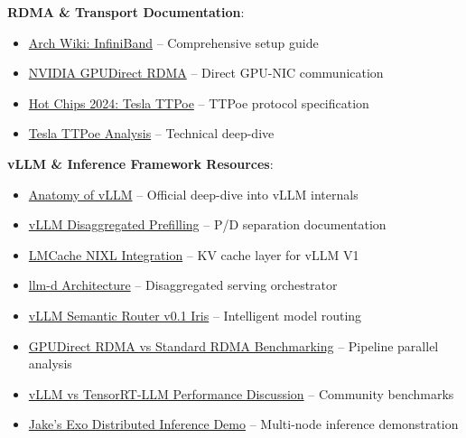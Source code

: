 \documentclass[10pt,letterpaper]{article}
\begin{document}
\textbf{RDMA \& Transport Documentation}:
\begin{itemize}[noitemsep]
    \item \href{https://wiki.archlinux.org/title/InfiniBand}{Arch Wiki: InfiniBand} -- Comprehensive setup guide
    \item \href{https://docs.nvidia.com/cuda/gpudirect-rdma/index.html}{NVIDIA GPUDirect RDMA} -- Direct GPU-NIC communication
    \item \href{https://hc2024.hotchips.org/assets/program/conference/day2/17_HC2024_Tesla_TTPoE_v5.pdf}{Hot Chips 2024: Tesla TTPoe} -- TTPoe protocol specification
    \item \href{https://chipsandcheese.com/p/teslas-ttpoe-at-hot-chips-2024-replacing-tcp-for-low-latency-applications}{Tesla TTPoe Analysis} -- Technical deep-dive
\end{itemize}

\textbf{vLLM \& Inference Framework Resources}:
\begin{itemize}[noitemsep]
    \item \href{https://blog.vllm.ai/2025/09/05/anatomy-of-vllm.html}{Anatomy of vLLM} -- Official deep-dive into vLLM internals
    \item \href{https://docs.vllm.ai/en/latest/features/disagg_prefill/}{vLLM Disaggregated Prefilling} -- P/D separation documentation
    \item \href{https://blog.lmcache.ai/2025-04-11-lmcache-vllmv1-nixl/}{LMCache NIXL Integration} -- KV cache layer for vLLM V1
    \item \href{https://llm-d.ai/docs/architecture}{llm-d Architecture} -- Disaggregated serving orchestrator
    \item \href{https://blog.vllm.ai/2026/01/05/vllm-sr-iris.html}{vLLM Semantic Router v0.1 Iris} -- Intelligent model routing
    \item \href{https://discuss.vllm.ai/t/vllm-benchmarking-why-is-gpudirect-rdma-not-outperforming-standard-rdma-in-a-pipeline-parallel-setup/1377}{GPUDirect RDMA vs Standard RDMA Benchmarking} -- Pipeline parallel analysis
    \item \href{https://www.reddit.com/r/LocalLLaMA/comments/1oyawkl/why_is_vllm_outperforming_tensorrtllm_nvidias/}{vLLM vs TensorRT-LLM Performance Discussion} -- Community benchmarks
    \item \href{https://www.reddit.com/r/LocalLLaMA/comments/1pq5k6e/jake_formerly_of_ltt_demonstrates_exos/}{Jake's Exo Distributed Inference Demo} -- Multi-node inference demonstration
\end{itemize}
\end{document}
